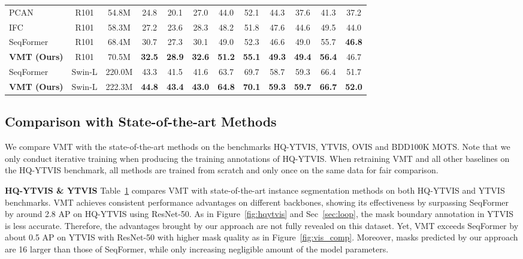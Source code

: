 \documentclass[runningheads]{llncs}
\newcommand{\parsection}[1]{\textbf{#1} }
\begin{document}
\begin{table}[!t]
{\begin{tabular}{l|c|c|ccc|ccc|ccc}
					PCAN~\cite{pcan} & R101 & 54.8M & 24.8 & 20.1 & 27.0 & 44.0 & 52.1 & 44.3 & 37.6 & 41.3 & 37.2 \\ IFC~\cite{hwang2021video} & R101 & 58.3M  & 27.2 & 23.6 & 28.3 & 48.2 & 51.8 & 47.6 & 44.6 & 49.5 & 44.0 \\ SeqFormer~\cite{wu2021seqformer} & R101 & 68.4M & 30.7 & 27.3 & 30.1 & 49.0 & 52.3 & 46.6  & 49.0 & 55.7 & \textbf{46.8} \\
					\textbf{VMT (Ours)} & R101 & 70.5M & \textbf{32.5} & \textbf{28.9} & \textbf{32.6} & \textbf{51.2} & \textbf{55.1} & \textbf{49.3} & \textbf{49.4} & \textbf{56.4} & 46.7 \\
					\midrule
					SeqFormer~\cite{wu2021seqformer} & Swin-L & 220.0M & 43.3 & 41.5  & 41.6 & 63.7 & 69.7 & 58.7 & 59.3 & 66.4 & 51.7 \\
					\textbf{VMT (Ours)} & Swin-L & 222.3M & \textbf{44.8} & \textbf{43.4}  & \textbf{43.0} & \textbf{64.8} & \textbf{70.1} & \textbf{59.3}  & \textbf{59.7} & \textbf{66.7} & \textbf{52.0} \\
				\bottomrule	\end{tabular}}
		\label{tab:viscomp}
\end{table}
	
\subsection{Comparison with State-of-the-art Methods}
We compare VMT with the state-of-the-art methods on the benchmarks HQ-YTVIS, YTVIS, OVIS and BDD100K MOTS.
Note that we only conduct iterative training when producing the training annotations of HQ-YTVIS. When retraining VMT and all other baselines on the HQ-YTVIS benchmark, all methods are trained from scratch and only once on the same data for fair comparison.


\parsection{HQ-YTVIS \& YTVIS} Table~\ref{tab:viscomp} compares VMT with state-of-the-art instance segmentation methods on both HQ-YTVIS and YTVIS benchmarks.
VMT achieves consistent performance advantages on different backbones, showing its effectiveness by surpassing SeqFormer~\cite{wu2021seqformer} by around 2.8 AP on HQ-YTVIS using ResNet-50. As in Figure~\ref{fig:hqytvis} and Sec~\ref{sec:loop}, the mask boundary annotation in YTVIS is less accurate. Therefore, the advantages brought by our approach are not fully revealed on this dataset. Yet, VMT exceeds SeqFormer by about 0.5 AP on YTVIS with ResNet-50 with higher mask quality as in Figure~\ref{fig:vis_comp}. Moreover, masks predicted by our approach are 16 larger than those of SeqFormer, while only increasing negligible amount of the model parameters. 
\end{document}
